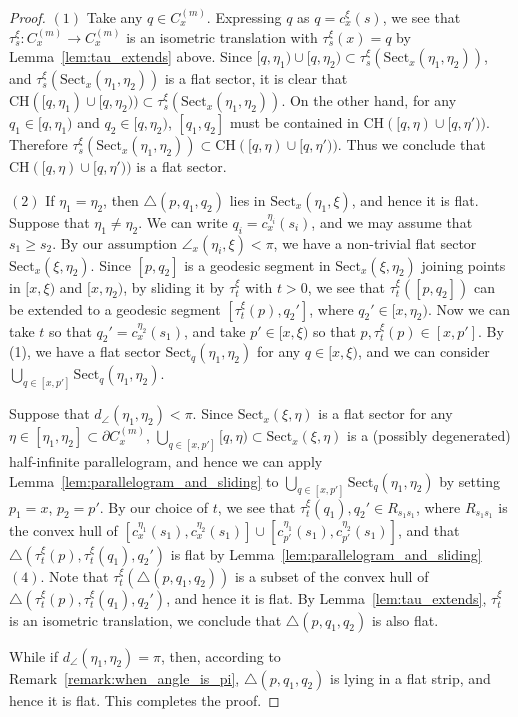 \documentclass[12pt]{amsart}
\numberwithin{equation}{section}
\theoremstyle{plain}
\theoremstyle{definition}
\theoremstyle{remark}
\newcommand{\ray}[1]{[#1)}
\newcommand{\cc}[2]{c_{#1}^{#2}}
\newcommand{\tri}[3]{\triangle(#1,#2,#3)}
\newcommand{\trans}[2]{\tau_{#1}^{#2}}
\newcommand{\ch}[1]{\mathrm{CH}(#1)}
\newcommand{\sect}[3][]{\mathrm{Sect}_{#1}(#2,#3)}
\newcommand{\cone}[2][]{C_{#1}^{(#2)}}
\begin{document}
\begin{proof}
$(1)$ Take any $q \in \cone[x]{m}$.  
 Expressing $q$ as $q=\cc{x}{\xi}(s)$, we see that 
 $\trans{s}{\xi}\colon \cone[x]{m}\rightarrow \cone[x]{m}$
 is an isometric translation with $\trans{s}{\xi}(x)=q$ 
 by Lemma~\ref{lem:tau_extends} above. 
 Since 
 $\ray{q,\eta_1}\cup \ray{q,\eta_2}
 \subset\trans{s}{\xi}(\sect[x]{\eta_1}{\eta_2})$, 
 and $\trans{s}{\xi}(\sect[x]{\eta_1}{\eta_2})$ is a flat sector, 
 it is clear that  
 $\ch{\ray{q,\eta_1}\cup\ray{q,\eta_2}}\subset 
 \trans{s}{\xi}(\sect[x]{\eta_1}{\eta_2})$. 
 On the other hand, for any $q_1\in \ray{q,\eta_1}$ and 
 $q_2\in \ray{q,\eta_2}$,  $[q_1,q_2]$ must be contained in  
 $\ch{\ray{q,\eta}\cup \ray{q,\eta'}}$. 
 Therefore
 $\trans{s}{\xi}(\sect[x]{\eta_1}{\eta_2})\subset
 \ch{\ray{q,\eta}\cup\ray{q,\eta'}}$. 
 Thus we conclude that $\ch{\ray{q,\eta}\cup\ray{q,\eta'}}$ is a flat
 sector. 

$(2)$ If $\eta_1=\eta_2$, then $\tri{p}{q_1}{q_2}$ lies in
 $\sect[x]{\eta_1}{\xi}$, and hence it is flat. 
 Suppose that $\eta_1\not= \eta_2$. 
 We can write $q_i=\cc{x}{\eta_i}(s_i)$, and we may assume that 
 $s_1\geq s_2$. 
 By our assumption $\angle_{x}(\eta_i,\xi)<\pi$, 
 we have a non-trivial flat sector
 $\sect[x]{\xi}{\eta_2}$. 
 Since $[p,q_2]$ is a geodesic segment in 
 $\sect[x]{\xi}{\eta_2}$ joining points in
 $\ray{x,\xi}$ and $\ray{x,\eta_2}$, by sliding it by
 $\trans{t}{\xi}$ with $t>0$, we see that 
 $\trans{t}{\xi}([p,q_2])$ can be extended to 
 a geodesic segment $[\trans{t}{\xi}(p), q_2']$, where 
 $q_2' \in \ray{x,\eta_2}$. 
 Now we can take $t$ so that $q_2'=\cc{x}{\eta_2}(s_1)$, and 
 take $p' \in \ray{x,\xi}$ so that 
 $p, \trans{t}{\xi}(p) \in [x,p']$. 
 By (1), we have a flat sector
 $\sect[q]{\eta_1}{\eta_2}$ for any $q \in \ray{x,\xi}$, and we can
 consider $\bigcup_{q \in [x,p']} \sect[q]{\eta_1}{\eta_2}$. 

 Suppose that $d_{\angle}(\eta_1,\eta_2)<\pi$. 
 Since $\sect[x]{\xi}{\eta}$ is a flat sector for any
 $\eta \in [\eta_1, \eta_2] \subset \partial \cone[x]{m}$, 
 $\bigcup_{q \in [x,p']}\ray{q,\eta}\subset \sect[x]{\xi}{\eta}$ is a 
 (possibly degenerated) half-infinite parallelogram, and hence 
 we can apply Lemma~\ref{lem:parallelogram_and_sliding} 
 to $\bigcup_{q \in [x,p']} \sect[q]{\eta_1}{\eta_2}$ by setting
 $p_1=x$, $p_2=p'$. 
 By our choice of $t$, we see that 
 $\trans{t}{\xi}(q_1), q_2'\in R_{s_1s_1}$, 
  where $R_{s_1s_1}$ is the convex hull of
 $[\cc{x}{\eta_1}(s_1),\cc{x}{\eta_2}(s_1)] \cup 
 [\cc{p'}{\eta_1}(s_1),\cc{p'}{\eta_2}(s_1)]$,
 and that 
 $\tri{\trans{t}{\xi}(p)}{\trans{t}{\xi}(q_1)}{q_2'}$ is
 flat by Lemma~\ref{lem:parallelogram_and_sliding} $(4)$. 
 Note that $\trans{t}{\xi}(\tri{p}{q_1}{q_2})$ is a subset of the
 convex hull of 
 $\tri{\trans{t}{\xi}(p)}{\trans{t}{\xi}(q_1)}{q_2'}$,
 and hence it is flat. 
 By Lemma~\ref{lem:tau_extends}, $\trans{t}{\xi}$ is an isometric
 translation, 
 we conclude that $\tri{p}{q_1}{q_2}$ is also flat. 

 While if $d_{\angle}(\eta_1,\eta_2)=\pi$, then, according to
 Remark~\ref{remark:when_angle_is_pi}, $\tri{p}{q_1}{q_2}$ is lying in
 a flat strip, and hence it is flat. 
 This completes the proof. 
\end{proof}
\end{document}
